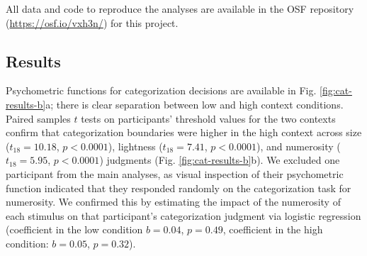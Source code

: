 \documentclass[a4paper, nobind]{templates/ociamthesis}
\begin{document}
All data and code to reproduce the analyses are available in the OSF repository (\url{https://osf.io/vxh3n/}) for this project.

\hypertarget{results-7}{%
\subsection{Results}\label{results-7}}

Psychometric functions for categorization decisions are available in Fig. \ref{fig:cat-results-b}a; there is clear separation between low and high context conditions. Paired samples \(t\) tests on participants' threshold values for the two contexts confirm that categorization boundaries were higher in the high context across size (\(t_{18}=10.18\), \(p<0.0001\)), lightness (\(t_{18}=7.41\), \(p<0.0001\)), and numerosity (\(t_{18}=5.95\), \(p<0.0001\)) judgments (Fig. \ref{fig:cat-results-b}b). We excluded one participant from the main analyses, as visual inspection of their psychometric function indicated that they responded randomly on the categorization task for numerosity. We confirmed this by estimating the impact of the numerosity of each stimulus on that participant's categorization judgment via logistic regression (coefficient in the low condition \(b=0.04\), \(p=0.49\), coefficient in the high condition: \(b=0.05\), \(p=0.32\)).
\end{document}
